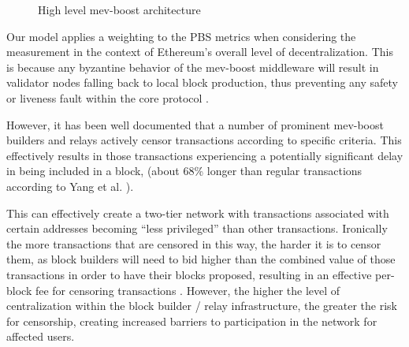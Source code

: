 \documentclass[conference]{IEEEtran}
\begin{document}
\begin{figure}[h]

\caption{High level mev-boost architecture}
\label{fig:mev-boost architecture}
\end{figure}

Our model applies a weighting to the PBS metrics when considering the measurement in the context of Ethereum's overall level of decentralization.  This is because any byzantine behavior of the mev-boost middleware will result in validator nodes falling back to local block production, thus preventing any safety or liveness fault within the core protocol \cite{hasu2022}.

However, it has been well documented \cite{labrys2022} that a number of prominent mev-boost builders and relays actively censor transactions according to specific criteria.  This effectively results in those transactions experiencing a potentially significant delay in being included in a block, (about 68\% longer than regular transactions according to Yang et al. \cite{yang2022sok}). 

This can effectively create a two-tier network with transactions associated with certain addresses becoming ``less privileged'' than other transactions.  Ironically the more transactions that are censored in this way, the harder it is to censor them, as block builders will need to bid higher than the combined value of those transactions in order to have their blocks proposed, resulting in an effective per-block fee for censoring transactions \cite{buterin2022}.  However, the higher the level of centralization within the block builder / relay infrastructure, the greater the risk for censorship, creating increased barriers to participation in the network for affected users.
\end{document}
